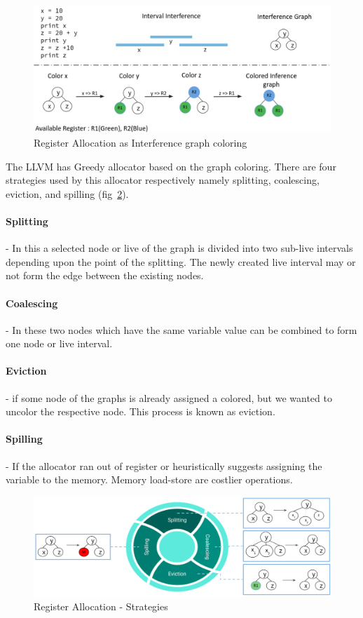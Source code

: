 \begin{figure}[t]
    \centering
    \includegraphics[scale=0.4]{figures/chapter-5/mlra_coloring.png}
    \caption{Register Allocation as Interference graph coloring}
     \label{fig:mlra-coloring}
\end{figure}
The LLVM has Greedy allocator  based on the graph coloring. There are four strategies used by this allocator respectively namely splitting, coalescing, eviction, and spilling (fig~\ref{fig:mlra-strat}). 

\paragraph{Splitting} - In this a selected node or live of the graph is divided into two sub-live intervals depending upon the point of the splitting. The newly created live interval may or not form the edge between the existing nodes.

\paragraph{Coalescing} - In these two nodes which have the same variable value can be combined to form one node or live interval. 
\paragraph{Eviction} - if some node of the graphs is already assigned a colored, but we wanted to uncolor the respective node. This process is known as eviction.
\paragraph{Spilling} - If the allocator ran out of register or heuristically suggests assigning the variable to the memory. Memory load-store are costlier operations.

\begin{figure}[t]
    \centering
    \includegraphics[scale=0.4]{figures/chapter-5/mlra_strategies.png}
    \caption{Register Allocation - Strategies}
     \label{fig:mlra-strat}
\end{figure}

